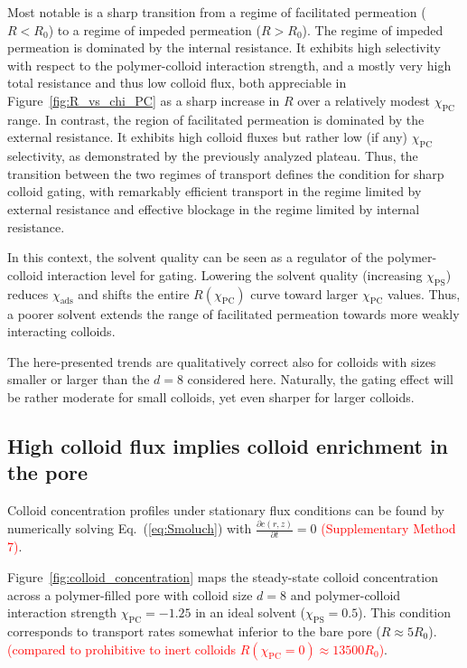 \documentclass[12pt, a4paper]{article}
\newcommand\todo[1]{\textcolor{red}{#1}}
\begin{document}
Most notable is a sharp transition from a regime of facilitated permeation ($R < R_0$) to a regime of impeded permeation ($R > R_0$).
The regime of impeded permeation is dominated by the internal resistance.
It exhibits high selectivity with respect to the polymer-colloid interaction strength, and a mostly very high total resistance and thus low colloid flux, both appreciable in Figure~\ref{fig:R_vs_chi_PC} as a sharp increase in $R$ over a relatively modest $\chi_{\text{PC}}$ range.
In contrast, the region of facilitated permeation is dominated by the external resistance. 
It exhibits high colloid fluxes but rather low (if any) $\chi_{\text{PC}}$ selectivity, as demonstrated by the previously analyzed plateau.
Thus, the transition between the two regimes of transport defines the condition for sharp colloid gating, with remarkably efficient transport in the regime limited by external resistance and effective blockage in the regime limited by internal resistance.

In this context, the solvent quality can be seen as a regulator of the polymer-colloid interaction level for gating. 
Lowering the solvent quality (increasing $\chi_{\text{PS}}$) reduces $\chi_{\text{ads}}$ and shifts the entire $R(\chi_{\text{PC}})$ curve toward larger $\chi_{\text{PC}}$ values.
Thus, a poorer solvent extends the range of facilitated permeation towards more weakly interacting colloids.

The here-presented trends are qualitatively correct also for colloids with sizes smaller or larger than the $d=8$ considered here.
Naturally, the gating effect will be rather moderate for small colloids, yet even sharper for larger colloids.


\subsection{High colloid flux implies colloid enrichment in the pore}

Colloid concentration profiles under stationary flux conditions can be found by numerically solving Eq.~(\ref{eq:Smoluch}) with $\frac{\partial c(r,z)}{\partial t} = 0$
\todo{(Supplementary Method 7)}.

Figure~\ref{fig:colloid_concentration} maps the steady-state colloid concentration across a polymer-filled pore with colloid size $d = 8$ and polymer-colloid interaction strength $\chi_{\text{PC}} = -1.25$ in an ideal solvent ($\chi_{\text{PS}} = 0.5$).
This condition corresponds to transport rates somewhat inferior to the bare pore ($R \approx 5 R_0$).
\todo{(compared to prohibitive to inert colloids $R(\chi_{\text{PC}}=0) \approx 13500 R_0$)}.
\end{document}
